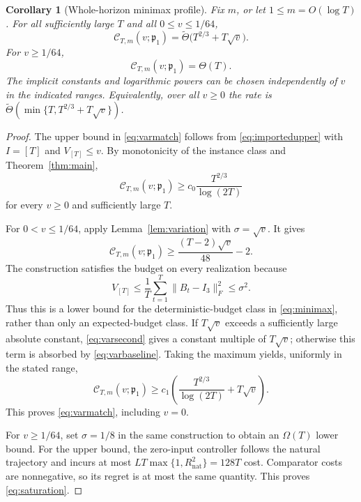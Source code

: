 \documentclass[11pt]{article}
\newtheorem{corollary}[theorem]{Corollary}
\theoremstyle{remark}
\newcommand{\nat}{\mathrm{nat}}
\newcommand{\cclass}{\mathcal C}
\begin{document}
\begin{corollary}[Whole-horizon minimax profile]\label{cor:variation}
Fix $m$, or let $1\le m=O(\log T)$. For all sufficiently large $T$
and all $0\le v\le1/64$,
\begin{equation}\label{eq:varmatch}
 \cclass_{T,m}(v;\mathfrak p_1)
 =\widetilde\Theta\bigl(T^{2/3}+T\sqrt v\bigr).
\end{equation}
For $v\ge1/64$,
\begin{equation}\label{eq:saturation}
 \cclass_{T,m}(v;\mathfrak p_1)=\Theta(T).
\end{equation}
The implicit constants and logarithmic powers can be chosen independently
of $v$ in the indicated ranges. Equivalently, over all $v\ge0$ the
rate is $\widetilde\Theta(\min\{T,T^{2/3}+T\sqrt v\})$.
\end{corollary}

\begin{proof}
The upper bound in \eqref{eq:varmatch} follows from
\eqref{eq:importedupper} with $I=[T]$ and $V_{[T]}\le v$.
By monotonicity of the instance class and Theorem~\ref{thm:main},
\begin{equation}\label{eq:varbaseline}
 \cclass_{T,m}(v;\mathfrak p_1)
 \ge c_0\frac{T^{2/3}}{\log(2T)}
\end{equation}
for every $v\ge0$ and sufficiently large $T$.

For $0<v\le1/64$, apply Lemma~\ref{lem:variation} with
$\sigma=\sqrt v$. It gives
\begin{equation}\label{eq:varsecond}
 \cclass_{T,m}(v;\mathfrak p_1)
 \ge \frac{(T-2)\sqrt v}{48}-2.
\end{equation}
The construction satisfies the budget on every realization because
\[
 V_{[T]}\le\frac1T\sum_{t=1}^T\|B_t-I_3\|_F^2
          \le\sigma^2.
\]
Thus this is a lower bound for the deterministic-budget class in
\eqref{eq:minimax}, rather than only an expected-budget class.
If $T\sqrt v$ exceeds a sufficiently large absolute constant,
\eqref{eq:varsecond} gives a constant multiple of $T\sqrt v$;
otherwise this term is absorbed by \eqref{eq:varbaseline}.
Taking the maximum yields, uniformly in the stated range,
\[
 \cclass_{T,m}(v;\mathfrak p_1)
 \ge c_1\left(\frac{T^{2/3}}{\log(2T)}+T\sqrt v\right).
\]
This proves \eqref{eq:varmatch}, including $v=0$.

For $v\ge1/64$, set $\sigma=1/8$ in the same construction to obtain
an $\Omega(T)$ lower bound. For the upper bound, the zero-input
controller follows the natural trajectory and incurs at most
$LT\max\{1,R_{\nat}^2\}=128T$ cost. Comparator costs are nonnegative,
so its regret is at most the same quantity. This proves
\eqref{eq:saturation}.
\end{proof}
\end{document}
